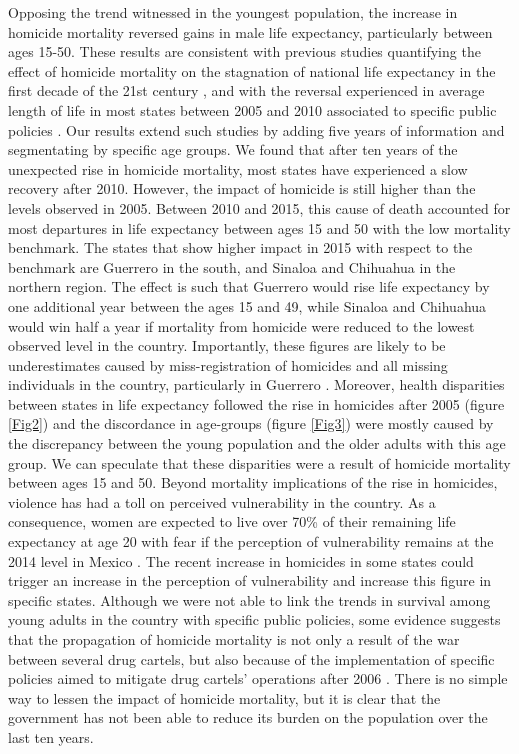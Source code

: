 \documentclass{bmcart}
\begin{document}
Opposing the trend witnessed in the youngest population, the increase in homicide mortality reversed gains in male life expectancy, particularly between ages 15-50. These results are consistent with previous studies quantifying the effect of homicide mortality on the stagnation of national life expectancy in the first decade of the 21st century \cite{canudas2014}, and with the reversal experienced in average length of life in most states between 2005 and 2010 associated to specific public policies \cite{Aburto2015}. Our results extend such studies by adding five years of information and segmentating by specific age groups. We found that after ten years of the unexpected rise in homicide mortality, most states have experienced a slow recovery after 2010. However, the impact of homicide is still higher than the levels observed in 2005. Between 2010 and 2015, this cause of death accounted for most departures in life expectancy between ages 15 and 50 with the low mortality benchmark. The states that show higher impact in 2015 with respect to the benchmark are Guerrero in the south, and Sinaloa and Chihuahua in the northern region. The effect is such that Guerrero would rise life expectancy by one additional year between the ages 15 and 49, while Sinaloa and Chihuahua would win half a year if mortality from homicide were reduced to the lowest observed level in the country. Importantly, these figures are likely to be underestimates caused by miss-registration of homicides and all missing individuals in the country, particularly in Guerrero \cite{HRW2011,wright2017epistemological}. Moreover, health disparities between states in life expectancy followed the rise in homicides after 2005 (figure \ref{Fig2}) and the discordance in age-groups (figure \ref{Fig3}) were mostly caused by the discrepancy between the young population and the older adults with this age group. We can speculate that these disparities were a result of homicide mortality between ages 15 and 50.
Beyond mortality implications of the rise in homicides, violence has had a toll on perceived vulnerability in the country. As a consequence,  women are expected to live over 70\% of their remaining life expectancy at age 20 with fear if the perception of vulnerability remains at the 2014 level in Mexico  \cite{canudas2017Mexico}. The recent increase in homicides in some states could trigger an increase in the perception of vulnerability and increase this figure in specific states. Although we were not able to link the trends in survival among young adults in the country with specific public policies, some evidence suggests that the propagation of homicide mortality is not only a result of the war between several drug cartels, but also because of the implementation of specific policies aimed to mitigate drug cartels' operations after 2006 \cite{espinal2015analysis}.
There is no simple way to lessen the impact of homicide mortality, but it is clear that the government has not been able to reduce its burden on the population over the last ten years.
\end{document}
